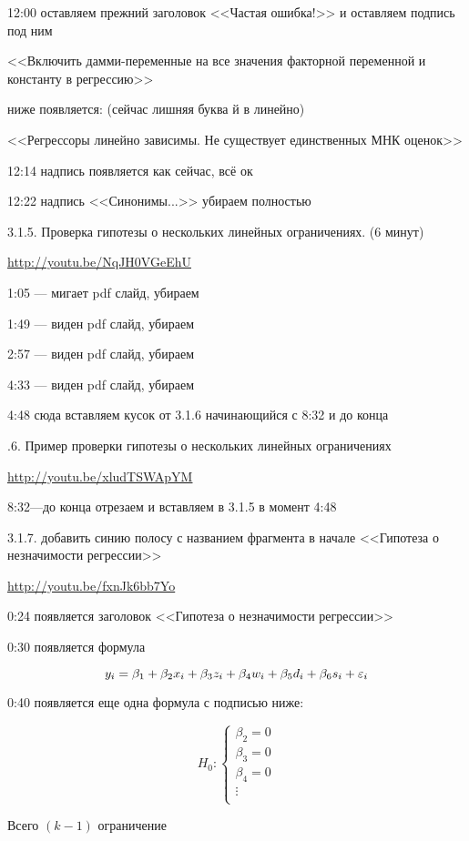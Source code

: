 \documentclass[12pt,a4paper]{article}
\begin{document}
12:00 оставляем прежний заголовок <<Частая ошибка!>> и оставляем подпись под ним

<<Включить дамми-переменные  на все значения факторной переменной и константу в регрессию>>

ниже появляется: (сейчас лишняя буква й в линейно)

<<Регрессоры линейно зависимы. Не существует единственных МНК оценок>> 

12:14 надпись появляется как сейчас, всё ок

12:22 надпись <<Синонимы...>> убираем полностью 



3.1.5. Проверка гипотезы о нескольких линейных ограничениях. (6 минут)

\url{http://youtu.be/NqJH0VGeEhU}

1:05 --- мигает pdf слайд, убираем

1:49 --- виден pdf слайд, убираем

2:57 --- виден pdf слайд, убираем

4:33 --- виден pdf слайд, убираем

4:48 сюда вставляем кусок от 3.1.6 начинающийся с 8:32 и до конца

.6. Пример проверки гипотезы о нескольких линейных ограничениях

\url{http://youtu.be/xludTSWApYM}

8:32---до конца отрезаем и вставляем в 3.1.5 в момент 4:48

3.1.7. добавить синию полосу с названием фрагмента в начале <<Гипотеза о незначимости регрессии>>

\url{http://youtu.be/fxnJk6bb7Yo}

0:24 появляется заголовок <<Гипотеза о незначимости регрессии>>

0:30 появляется формула

\[
y_i=\beta_1 + \beta_2 x_i + \beta_3 z_i + \beta_4 w_i + \beta_5 d_i +\beta_6 s_i + \varepsilon_i
\]

0:40 появляется еще одна формула с подписью ниже:

\[
H_0: \begin{cases}
\beta_2 = 0 \\
\beta_3 = 0 \\
\beta_4 = 0 \\
\vdots \\
\end{cases}
\]

Всего $(k-1)$ ограничение
\end{document}
